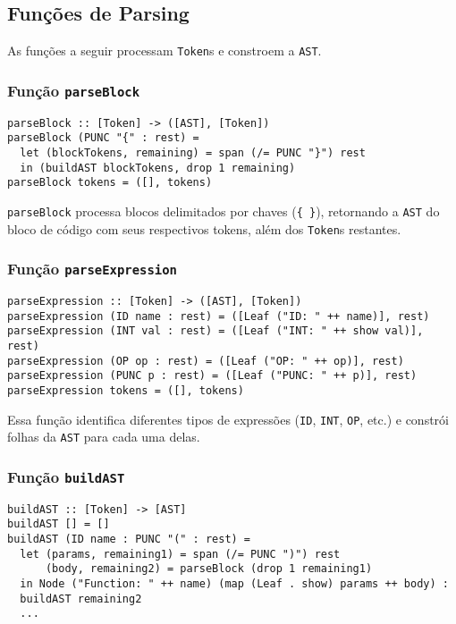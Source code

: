 \documentclass{article}
\begin{document}
\subsection{Funções de Parsing}
As funções a seguir processam \texttt{Token}s e constroem a \texttt{AST}.

\subsubsection{Função \texttt{parseBlock}}
\begin{verbatim}
parseBlock :: [Token] -> ([AST], [Token])
parseBlock (PUNC "{" : rest) =
  let (blockTokens, remaining) = span (/= PUNC "}") rest
  in (buildAST blockTokens, drop 1 remaining)
parseBlock tokens = ([], tokens)
\end{verbatim}
\texttt{parseBlock} processa blocos delimitados por chaves (\texttt{\{ \}}), retornando a \texttt{AST} do bloco de código com seus respectivos tokens, além dos \texttt{Token}s restantes.

\subsubsection{Função \texttt{parseExpression}}
\begin{verbatim}
parseExpression :: [Token] -> ([AST], [Token])
parseExpression (ID name : rest) = ([Leaf ("ID: " ++ name)], rest)
parseExpression (INT val : rest) = ([Leaf ("INT: " ++ show val)], rest)
parseExpression (OP op : rest) = ([Leaf ("OP: " ++ op)], rest)
parseExpression (PUNC p : rest) = ([Leaf ("PUNC: " ++ p)], rest)
parseExpression tokens = ([], tokens)
\end{verbatim}
Essa função identifica diferentes tipos de expressões (\texttt{ID}, \texttt{INT}, \texttt{OP}, etc.) e constrói folhas da \texttt{AST} para cada uma delas.

\subsubsection{Função \texttt{buildAST}}
\begin{verbatim}
buildAST :: [Token] -> [AST]
buildAST [] = []
buildAST (ID name : PUNC "(" : rest) =
  let (params, remaining1) = span (/= PUNC ")") rest
      (body, remaining2) = parseBlock (drop 1 remaining1)
  in Node ("Function: " ++ name) (map (Leaf . show) params ++ body) : 
  buildAST remaining2
  ...
\end{verbatim}
\end{document}
